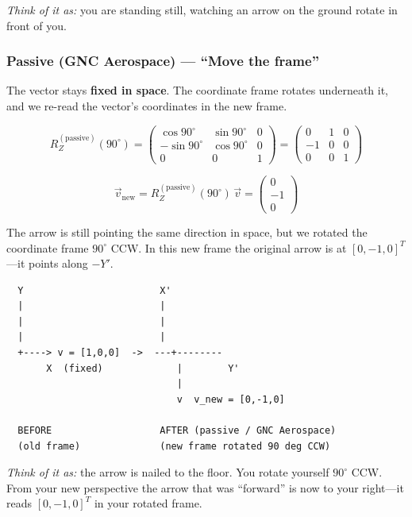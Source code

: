 \documentclass[12pt,a4paper]{article}
\begin{document}
\emph{Think of it as:} you are standing still, watching an arrow on the ground
rotate in front of you.

\subsubsection*{Passive (GNC Aerospace) --- ``Move the frame''}

The vector stays \textbf{fixed in space}.  The coordinate frame rotates
underneath it, and we re-read the vector's coordinates in the new frame.

\begin{equation}
  R_Z^{(\text{passive})}(90^\circ)
  = \begin{pmatrix}
      \cos 90^\circ &  \sin 90^\circ & 0 \\
     -\sin 90^\circ &  \cos 90^\circ & 0 \\
      0             &  0             & 1
    \end{pmatrix}
  = \begin{pmatrix} 0 & 1 & 0 \\ -1 & 0 & 0 \\ 0 & 0 & 1 \end{pmatrix}
\end{equation}

\begin{equation}
  \vec{v}_{\text{new}} = R_Z^{(\text{passive})}(90^\circ)\,\vec{v}
  = \begin{pmatrix} 0\\-1\\0 \end{pmatrix}
\end{equation}

The arrow is still pointing the same direction in space, but we rotated the
coordinate frame $90^\circ$ CCW.  In this new frame the original arrow is at
$[0,-1,0]^T$---it points along $-Y'$.

\begin{verbatim}
  Y                        X'
  |                        |
  |                        |
  |                        |
  +----> v = [1,0,0]  ->  ---+--------
       X  (fixed)             |        Y'
                              |
                              v  v_new = [0,-1,0]

  BEFORE                   AFTER (passive / GNC Aerospace)
  (old frame)              (new frame rotated 90 deg CCW)
\end{verbatim}

\emph{Think of it as:} the arrow is nailed to the floor.  You rotate yourself
$90^\circ$ CCW.  From your new perspective the arrow that was ``forward'' is
now to your right---it reads $[0,-1,0]^T$ in your rotated frame.
\end{document}

